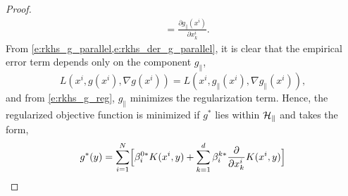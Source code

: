 \begin{proof}
\begin{equation}
\begin{aligned}
	&  = \frac{\partial g_\parallel(x^i) }{\partial x^i_k}.
	\end{aligned}
	\label{e:rkhs_der_g_parallel}
	\end{equation}
	From \cref{e:rkhs_g_parallel,e:rkhs_der_g_parallel}, it is clear that the empirical error term depends only on the component $g_\parallel$,
	\[
	L(x^i, g(x^i),\nabla g(x^i)) = L(x^i, g_\parallel(x^i),\nabla g_\parallel(x^i)),
	\]
	and from \eqref{e:rkhs_g_reg}, $g_\parallel$ minimizes the regularization term. Hence, the regularized objective function is minimized if $g^*$ lies within ${\cal H}_\parallel$ and takes the form,
	\[
	g^*(y) = \sum_{i=1}^N  \Bigl[ \beta_i^{0*}  K(x^i, y)   +  \sum_{k =1}^d  \beta_i^{k*} \frac{\partial}{\partial x^i_k}  K(x^i, y) \Bigr]
	\]
\end{proof}

